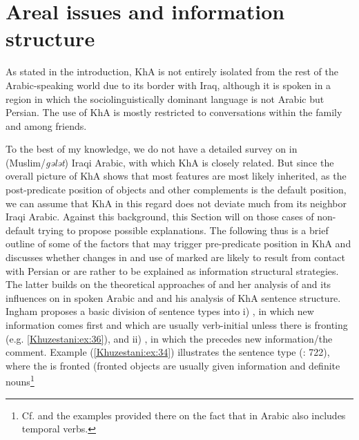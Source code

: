 \documentclass[output=paper,colorlinks,citecolor=brown,draftmode]{langscibook}
\begin{document}
\section{Areal issues and information structure}\label{Khuzestani:ss:3}

As stated in the introduction, KhA is not entirely isolated from the rest of the Arabic-speaking world due to its border with Iraq, although it is spoken in a region in which the sociolinguistically dominant language is not Arabic but Persian. The use of KhA is mostly restricted to conversations within the family and among friends. 

To the best of my knowledge, we do not have a detailed survey on  in (Muslim/\textit{gələt}) Iraqi Arabic, with which KhA is closely related. But since the overall picture of KhA  shows that most  features are most likely inherited, as the post-predicate position of objects and other complements is the default position, we can assume that KhA in this regard does not deviate much from its neighbor Iraqi Arabic. Against this background, this Section will  on those cases of non-default  trying to propose possible explanations. The following thus is a brief outline of some of the factors that may trigger pre-predicate position in KhA and discusses whether changes in  and use of marked  are likely to result from contact with Persian or are rather to be explained as information structural strategies. The latter builds on the theoretical approaches of \citet[315--362]{brustad2000} and her analysis of  and its influences on  in spoken Arabic and \citet{ingham1991} and his analysis of KhA sentence structure. Ingham proposes a basic division of sentence types into i) , in which new information comes first and which are usually verb-initial unless there is  fronting (e.g. \ref{Khuzestani:ex:36}), and ii) , in which the  precedes new information/the comment. Example (\ref{Khuzestani:ex:34}) illustrates the  sentence type (\citealt{ingham1991}: 722), where the  is fronted (fronted objects are usually given information and definite nouns\footnote{Cf.
    \citet[339]{brustad2000} and the examples provided there on the fact that  in Arabic also includes temporal verbs.
}
\end{document}

